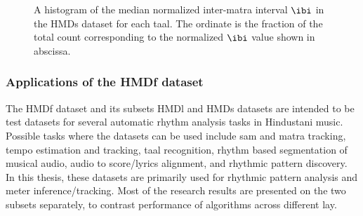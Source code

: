 \begin{figure}[t]
\centering
{} \hspace{0.5cm} 
 \\ 
 \hspace{0.5cm} 
 \\ 
\caption[Histogram of median normalized $\protect\ibi$ in the \acrshort{HMDs} dataset]{A histogram of the median normalized inter-\gls{matra} interval $\protect\ibi$ in the \acrshort{HMDs} dataset for each \gls{taal}. The ordinate is the fraction of the total count corresponding to the normalized $\ibi$ value shown in abscissa.}\label{fig:dstats:HMDs:IAInorm}
\end{figure}


% 
\subsubsection{Applications of the \acrshort{HMDf} dataset}
The \acrshort{HMDf} dataset and its subsets \acrshort{HMDl} and \acrshort{HMDs} datasets are intended to be test datasets for several automatic rhythm analysis tasks in Hindustani music. Possible tasks where the datasets can be used include \gls{sam} and \gls{matra} tracking, tempo estimation and tracking, \gls{taal} recognition, rhythm based segmentation of musical audio, audio to score/lyrics alignment, and rhythmic pattern discovery. In this thesis, these datasets are primarily used for rhythmic pattern analysis and meter inference/tracking. Most of the research results are presented on the two subsets separately, to contrast performance of algorithms across different \gls{lay}. 